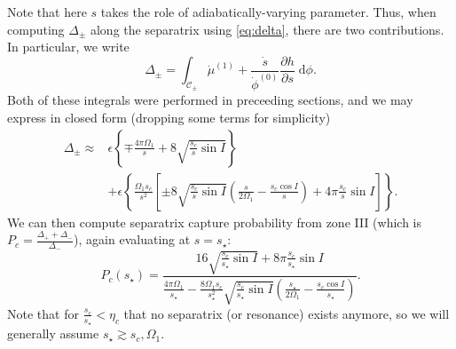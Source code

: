 \documentclass[
        fleqn,
        usenatbib,
    ]{mnras}
\newcommand*{\pd}[2]{\frac{\partial#1}{\partial#2}}
\newcommand*{\p}[1]{\left(#1\right)}
\newcommand*{\s}[1]{\left[#1\right]}
\newcommand*{\z}[1]{\left\{#1\right\}}
\begin{document}
Note that here $s$ takes the role of adiabatically-varying parameter. Thus, when
computing $\Delta_{\pm}$ along the separatrix using \autoref{eq:delta}, there
are two contributions. In particular, we write
\begin{equation}
    \Delta_{\pm} = \int_{\mathcal{C}_{\pm}} \dot{\mu}^{(1)} +
        \frac{\dot{s}}{\dot{\phi}^{(0)}} \pd{h}{s}
        \;\mathrm{d}\phi.
\end{equation}
Both of these integrals were performed in preceeding sections, and we may
express in closed form (dropping some terms for simplicity)
\begin{align}
    \Delta_{\pm} \approx{}& \epsilon\z{
            \mp \frac{4\pi  \Omega_1}{s} + 8\sqrt{\frac{s_c}{s}\sin I}
            }\nonumber\\
        &+\epsilon\z{\frac{ \Omega_1 s_c}{s^2}
            \s{\pm 8\sqrt{\frac{s_c}{s} \sin I}
            \p{\frac{s}{2\Omega_1} - \frac{s_c\cos I}{s}}
                + 4\pi \frac{s_c}{s}\sin I}}.\label{eq:delta_p3}
\end{align}
We can then compute separatrix capture probability from zone III (which is $P_c
= \frac{\Delta_+ + \Delta_-}{\Delta_-}$), again evaluating at $s = s_\star$:
\begin{equation}
    P_c(s_\star) = \frac{16\sqrt{\frac{s_c}{s_\star}\sin I} +
        8\pi\frac{s_c}{s_\star}\sin I}{
            \frac{4\pi \Omega_1}{s_\star} - \frac{8\Omega_1
            s_c}{s_\star^2}\sqrt{\frac{s_c}{s_\star}\sin I}
            \p{\frac{s_\star}{2\Omega_1} - \frac{s_c \cos I}{s_\star}}}.
            \label{eq:p_c_p3}
\end{equation}
Note that for $\frac{s_c}{s_\star} < \eta_c$ that no separatrix (or resonance)
exists anymore, so we will generally assume $s_\star \gtrsim s_c, \Omega_1$.
\end{document}
